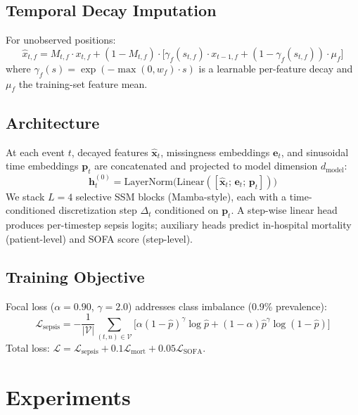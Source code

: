 \documentclass[11pt,a4paper]{article}
\begin{document}
\subsection{Temporal Decay Imputation}

For unobserved positions:
\begin{equation}
  \hat{x}_{t,f} = M_{t,f} \cdot x_{t,f}
    + (1 - M_{t,f}) \cdot \bigl[
        \gamma_f(s_{t,f}) \cdot x_{t-1,f}
        + (1-\gamma_f(s_{t,f})) \cdot \mu_f \bigr]
\end{equation}
where $\gamma_f(s) = \exp(-\max(0,w_f) \cdot s)$ is a learnable per-feature
decay and $\mu_f$ the training-set feature mean.

\subsection{Architecture}

At each event $t$, decayed features $\hat{\mathbf{x}}_t$, missingness
embeddings $\mathbf{e}_t$, and sinusoidal time embeddings $\mathbf{p}_t$ are
concatenated and projected to model dimension $d_\text{model}$:
\begin{equation}
  \mathbf{h}_t^{(0)} = \text{LayerNorm}\bigl(\text{Linear}(
    [\hat{\mathbf{x}}_t;\, \mathbf{e}_t;\, \mathbf{p}_t])\bigr)
\end{equation}
We stack $L=4$ selective SSM blocks (Mamba-style), each with a time-conditioned
discretization step $\Delta_t$ conditioned on $\mathbf{p}_t$.  A step-wise
linear head produces per-timestep sepsis logits; auxiliary heads predict
in-hospital mortality (patient-level) and SOFA score (step-level).

\subsection{Training Objective}

Focal loss \citep{lin2017focal} ($\alpha=0.90$, $\gamma=2.0$) addresses class
imbalance (0.9\% prevalence):
\begin{equation}
  \mathcal{L}_\text{sepsis} = -\frac{1}{|\mathcal{V}|}\sum_{(t,n) \in \mathcal{V}}
    \bigl[\alpha(1-\hat{p})^\gamma \log \hat{p}
    + (1-\alpha)\hat{p}^\gamma \log(1-\hat{p})\bigr]
\end{equation}
Total loss: $\mathcal{L} = \mathcal{L}_\text{sepsis} + 0.1\mathcal{L}_\text{mort}
+ 0.05\mathcal{L}_\text{SOFA}$.

\section{Experiments}
\label{sec:experiments}
\end{document}
